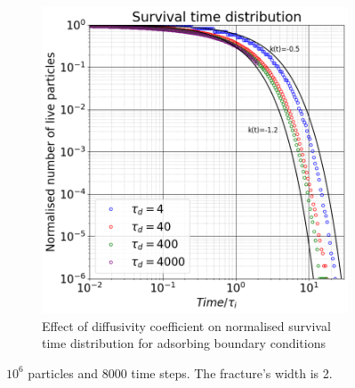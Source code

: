 \documentclass{article}
\begin{document}
\begin{figure}[htbp]
\begin{subfigure}[b]{0.45\textwidth}
        \includegraphics[width=\textwidth]{images/survTimeDistCompareDiffNorm.png}
        \caption{Effect of diffusivity coefficient on normalised survival time distribution for adsorbing boundary conditions}
    \end{subfigure}
    \caption{$10^6$ particles and 8000 time steps. The fracture's width is 2.}
    \label{fig:survTimeDiff}
\end{figure}
\end{document}
